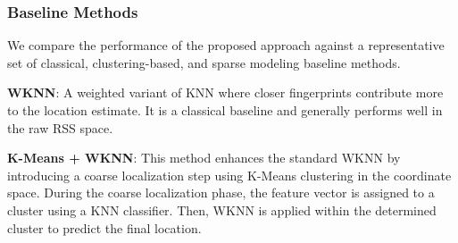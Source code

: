 \documentclass[journal,twoside,web]{ieeecolor}
\begin{document}
\begin{table}[t]
\centering
\caption{Mean Localization Error (in Meters) and Computation Time (Average per Test Sample in ms) on UJIIndoorLoc and Geotec Datasets}
\tiny
{}
\label{tab:benchmark_static_errors}
\end{table}
\subsubsection{Baseline Methods}
We compare the performance of the proposed approach against a representative set of classical, clustering-based, and sparse modeling baseline methods. 

 \textbf{WKNN}: A weighted variant of KNN where closer fingerprints contribute more to the location estimate. It is a classical baseline and generally performs well in the raw RSS space.

 \textbf{K-Means + WKNN}: This method enhances the standard WKNN by introducing a coarse localization step using K-Means clustering in the coordinate space. During the coarse localization phase, the feature vector is assigned to a cluster using a KNN classifier. Then, WKNN is applied within the determined cluster to predict the final location.
\end{document}
